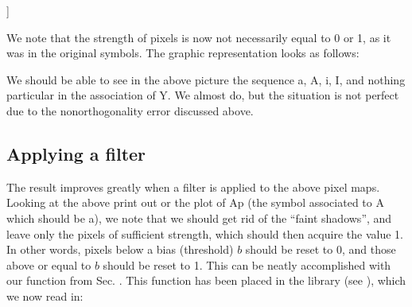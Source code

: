 \documentclass[letterpaper,10pt,english]{jupyterBook}
\begin{document}
\begin{sphinxVerbatim}[commandchars=\\\{\}]
[[0.   0.   0.   0.   0.   0.   0.   0.   0.   0.   0.   0.  ]
 [0.   0.   0.   0.   0.25 0.85 0.25 0.   0.   0.   0.   0.  ]
 [0.   0.   0.   0.   0.   0.85 0.   0.   0.   0.   0.   0.  ]
 [0.   0.   0.   1.   1.6  1.85 1.89 0.   0.   0.   0.   0.  ]
 [0.   0.   1.   0.   0.6  0.25 1.6  0.   0.   0.   0.   0.  ]
 [0.   0.   1.   0.6  0.   0.54 1.29 0.6  0.   0.   0.   0.  ]
 [0.   0.   1.   0.6  0.   0.25 1.29 0.6  0.   0.   0.   0.  ]
 [0.   0.   0.6  1.6  1.6  1.85 1.89 1.6  0.6  0.   0.   0.  ]
 [0.   0.   0.6  0.   0.   0.25 0.29 0.   0.6  0.   0.   0.  ]
 [0.   0.6  0.   0.   0.   0.25 0.   0.29 0.29 0.6  0.   0.  ]
 [0.   0.6  0.   0.   0.25 0.25 0.25 0.   0.   0.6  0.   0.  ]
 [0.   0.   0.   0.   0.   0.   0.   0.   0.   0.   0.   0.  ]]
\end{sphinxVerbatim}

\sphinxAtStartPar
We note that the strength of pixels is now not necessarily equal to 0 or 1, as it was in the original symbols. The graphic representation looks as follows:

\noindent{}

\sphinxAtStartPar
We should be able to see in the above picture the sequence a, A, i, I, and nothing particular in the association of Y. We almost do, but the situation is not perfect due to the nonorthogonality error discussed above.


\subsection{Applying a filter}
\label{\detokenize{docs/memory:applying-a-filter}}
\sphinxAtStartPar
The result improves greatly when a filter is applied to the above pixel maps. Looking at the above print out or the plot of Ap (the symbol associated to A which should be a), we note that we should get rid of the “faint shadows”, and leave only the pixels of sufficient strength, which should then acquire the value 1. In other words, pixels below a bias (threshold) \(b\) should be reset to 0, and those above or equal to \(b\) should be reset to 1. This can be neatly accomplished with our  function from Sec. {\hyperref[\detokenize{docs/mcp:mcp-p-lab}]{}}. This function has been placed in the library  (see {\hyperref[\detokenize{docs/appendix:app-lab}]{}}), which we now read in:
\end{document}
